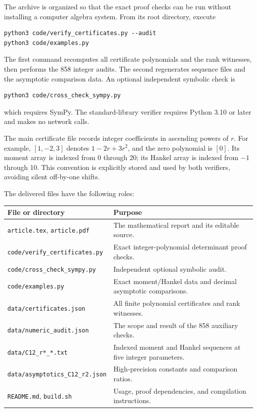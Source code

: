 \documentclass[11pt,letterpaper]{article}
\numberwithin{equation}{section}
\theoremstyle{definition}
\begin{document}
The archive is organized so that the exact proof checks can be run without
installing a computer algebra system. From its root directory, execute
\begin{lstlisting}
python3 code/verify_certificates.py --audit
python3 code/examples.py
\end{lstlisting}
The first command recomputes all certificate polynomials and the rank
witnesses, then performs the 858 integer audits. The second regenerates
sequence files and the asymptotic comparison data. An optional independent
symbolic check is
\begin{lstlisting}
python3 code/cross_check_sympy.py
\end{lstlisting}
which requires SymPy. The standard-library verifier requires Python 3.10
or later and makes no network calls.

The main certificate file records integer coefficients in ascending powers
of \(r\). For example, \([1,-2,3]\) denotes \(1-2r+3r^2\), and the zero
polynomial is \([0]\). Its moment array is indexed from 0 through 20; its
Hankel array is indexed from \(-1\) through 10. This convention is explicitly
stored and used by both verifiers, avoiding silent off-by-one shifts.

The delivered files have the following roles:
\begin{center}
\small
\begin{tabular}{p{}p{}}
\toprule
File or directory&Purpose\\
\midrule
\texttt{article.tex}, \texttt{article.pdf}&The mathematical report and its editable source.\\
\texttt{code/verify\_certificates.py}&Exact integer-polynomial determinant proof checks.\\
\texttt{code/cross\_check\_sympy.py}&Independent optional symbolic audit.\\
\texttt{code/examples.py}&Exact moment/Hankel data and decimal asymptotic comparisons.\\
\texttt{data/certificates.json}&All finite polynomial certificates and rank witnesses.\\
\texttt{data/numeric\_audit.json}&The scope and result of the 858 auxiliary checks.\\
\texttt{data/C12\_r*\_*.txt}&Indexed moment and Hankel sequences at five integer parameters.\\
\texttt{data/asymptotics\_C12\_r2.json}&High-precision constants and comparison ratios.\\
\texttt{README.md}, \texttt{build.sh}&Usage, proof dependencies, and compilation instructions.\\
\bottomrule
\end{tabular}
\end{center}
\end{document}

